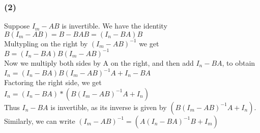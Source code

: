 \documentclass{article}
\begin{document}
\subsubsection{(2)}
Suppose $I_m - AB$ is invertible. We have the identity
\\$B(I_m-AB)=B-BAB=(I_n-BA)B$ 
\\Multypling on the right by $(I_m-AB)^{-1}$ we get
\\$B=(I_n-BA)B(I_m-AB)^{-1}$ 
\\Now we multiply both sides by A on the right, and then add $I_n-BA$, to obtain
\\$I_n=(I_n-BA)B(I_m-AB)^{-1}A+I_n-BA$
\\Factoring the right side, we get
\\$I_n=(I_n-BA)*(B(I_m-AB)^{-1}A+I_n)$
\\Thus $I_n-BA$ is invertible, as its inverse is given by $(B(I_m-AB)^{-1}A+I_n)$.
\\Similarly, we can write $(I_m - AB)^{-1} = (A(I_n - BA)^{-1} B+ I_m)$
\end{document}
